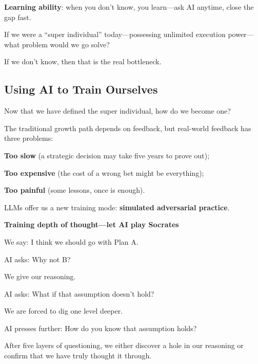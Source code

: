 \textbf{Learning ability}: when you don't know, you learn---ask AI anytime, close the gap fast.

\begin{thinkbox}[Reflection]
If we were a ``super individual'' today---possessing unlimited execution power---what problem would we go solve?

If we don't know, then that is the real bottleneck.
\end{thinkbox}

\subsection{Using AI to Train Ourselves}

Now that we have defined the super individual, how do we become one?

The traditional growth path depends on feedback, but real-world feedback has three problems:

\textbf{Too slow} (a strategic decision may take five years to prove out);

\textbf{Too expensive} (the cost of a wrong bet might be everything);

\textbf{Too painful} (some lessons, once is enough).

\vspace{1em}

LLMs offer us a new training mode: \textbf{simulated adversarial practice}.

\textbf{Training depth of thought---let AI play Socrates}

\begin{myquote}
We say: I think we should go with Plan A.

AI asks: Why not B?

We give our reasoning.

AI asks: What if that assumption doesn't hold?

We are forced to dig one level deeper.

AI presses further: How do you know that assumption holds?
\end{myquote}

After five layers of questioning, we either discover a hole in our reasoning or confirm that we have truly thought it through.

